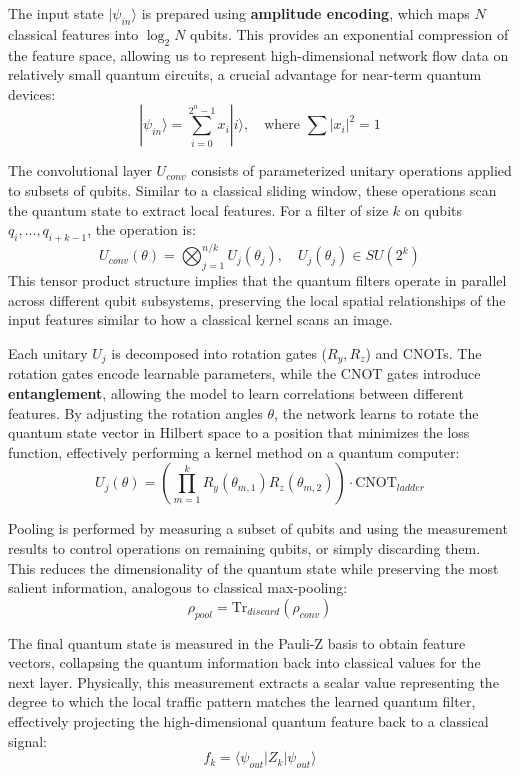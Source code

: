 \documentclass[conference]{IEEEtran}
\begin{document}
The input state $|\psi_{in}\rangle$ is prepared using \textbf{amplitude encoding}, which maps $N$ classical features into $\log_2 N$ qubits. This provides an exponential compression of the feature space, allowing us to represent high-dimensional network flow data on relatively small quantum circuits, a crucial advantage for near-term quantum devices:
\begin{equation}
|\psi_{in}\rangle = \sum_{i=0}^{2^n-1} x_i |i\rangle, \quad \text{where } \sum |x_i|^2 = 1
\end{equation}

The convolutional layer $U_{conv}$ consists of parameterized unitary operations applied to subsets of qubits. Similar to a classical sliding window, these operations scan the quantum state to extract local features. For a filter of size $k$ on qubits $q_i, ..., q_{i+k-1}$, the operation is:
\begin{equation}
U_{conv}(\theta) = \bigotimes_{j=1}^{n/k} U_j(\theta_j), \quad U_j(\theta_j) \in SU(2^k)
\end{equation}
This tensor product structure implies that the quantum filters operate in parallel across different qubit subsystems, preserving the local spatial relationships of the input features similar to how a classical kernel scans an image.

Each unitary $U_j$ is decomposed into rotation gates ($R_y, R_z$) and CNOTs. The rotation gates encode learnable parameters, while the CNOT gates introduce \textbf{entanglement}, allowing the model to learn correlations between different features. By adjusting the rotation angles $\theta$, the network learns to rotate the quantum state vector in Hilbert space to a position that minimizes the loss function, effectively performing a kernel method on a quantum computer:
\begin{equation}
U_j(\theta) = \left(\prod_{m=1}^{k} R_y(\theta_{m,1})R_z(\theta_{m,2})\right) \cdot \text{CNOT}_{ladder}
\end{equation}

Pooling is performed by measuring a subset of qubits and using the measurement results to control operations on remaining qubits, or simply discarding them. This reduces the dimensionality of the quantum state while preserving the most salient information, analogous to classical max-pooling:
\begin{equation}
\rho_{pool} = \text{Tr}_{discard}(\rho_{conv})
\end{equation}

The final quantum state is measured in the Pauli-Z basis to obtain feature vectors, collapsing the quantum information back into classical values for the next layer. Physically, this measurement extracts a scalar value representing the degree to which the local traffic pattern matches the learned quantum filter, effectively projecting the high-dimensional quantum feature back to a classical signal:
\begin{equation}
f_k = \langle \psi_{out} | Z_k | \psi_{out} \rangle
\end{equation}
\end{document}
